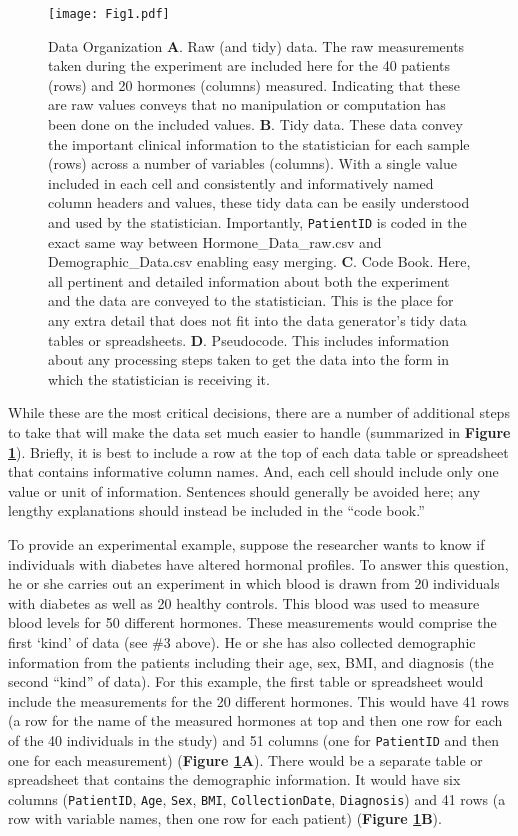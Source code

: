 \documentclass[12pt]{article}
\begin{document}
\begin{figure}[htbp]
\centering
\texttt{[image: Fig1.pdf]}
\caption{Data Organization \textbf{A}. Raw (and tidy) data. The raw
measurements taken during the experiment are included here for the 40
patients (rows) and 20 hormones (columns) measured. Indicating that
these are raw values conveys that no manipulation or computation has
been done on the included values. \textbf{B}. Tidy data. These data
convey the important clinical information to the statistician for each
sample (rows) across a number of variables (columns). With a single
value included in each cell and consistently and informatively named
column headers and values, these tidy data can be easily understood and
used by the statistician. Importantly, \texttt{PatientID} is coded in
the exact same way between Hormone\_Data\_raw.csv and
Demographic\_Data.csv enabling easy merging. \textbf{C}. Code Book.
Here, all pertinent and detailed information about both the experiment
and the data are conveyed to the statistician. This is the place for any
extra detail that does not fit into the data generator's tidy data
tables or spreadsheets. \textbf{D}. Pseudocode. This includes
information about any processing steps taken to get the data into the
form in which the statistician is receiving it. \label{fig1}}
\end{figure}

While these are the most critical decisions, there are a number of
additional steps to take that will make the data set much easier to
handle \citep{broman_data_2017} (summarized in \textbf{Figure
\ref{fig1}}). Briefly, it is best to include a row at the top of each
data table or spreadsheet that contains informative column names. And,
each cell should include only one value or unit of information.
Sentences should generally be avoided here; any lengthy explanations
should instead be included in the ``code book.''

To provide an experimental example, suppose the researcher wants to know
if individuals with diabetes have altered hormonal profiles. To answer
this question, he or she carries out an experiment in which blood is
drawn from 20 individuals with diabetes as well as 20 healthy controls.
This blood was used to measure blood levels for 50 different hormones.
These measurements would comprise the first `kind' of data (see \#3
above). He or she has also collected demographic information from the
patients including their age, sex, BMI, and diagnosis (the second
``kind'' of data). For this example, the first table or spreadsheet
would include the measurements for the 20 different hormones. This would
have 41 rows (a row for the name of the measured hormones at top and
then one row for each of the 40 individuals in the study) and 51 columns
(one for \texttt{PatientID} and then one for each measurement)
(\textbf{Figure \ref{fig1}A}). There would be a separate table or
spreadsheet that contains the demographic information. It would have six
columns (\texttt{PatientID}, \texttt{Age}, \texttt{Sex}, \texttt{BMI},
\texttt{CollectionDate}, \texttt{Diagnosis}) and 41 rows (a row with
variable names, then one row for each patient) (\textbf{Figure
\ref{fig1}B}).
\end{document}
